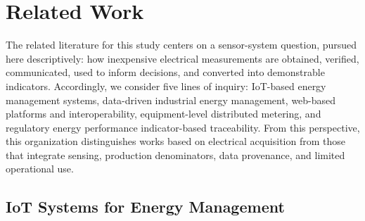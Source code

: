 \documentclass[technologies,article,submit,pdftex,moreauthors]{Definitions/mdpi}
\begin{document}
\section{Related Work}
\label{sec:related-work}

The related literature for this study centers on a sensor-system question, pursued here descriptively: how inexpensive electrical measurements are obtained, verified, communicated, used to inform decisions, and converted into demonstrable indicators. Accordingly, we consider five lines of inquiry: IoT-based energy management systems, data-driven industrial energy management, web-based platforms and interoperability, equipment-level distributed metering, and regulatory energy performance indicator-based traceability. From this perspective, this organization distinguishes works based on electrical acquisition from those that integrate sensing, production denominators, data provenance, and limited operational use. 

\subsection{IoT Systems for Energy Management}
\label{subsec:iot-systems-energy-management}
\end{document}
